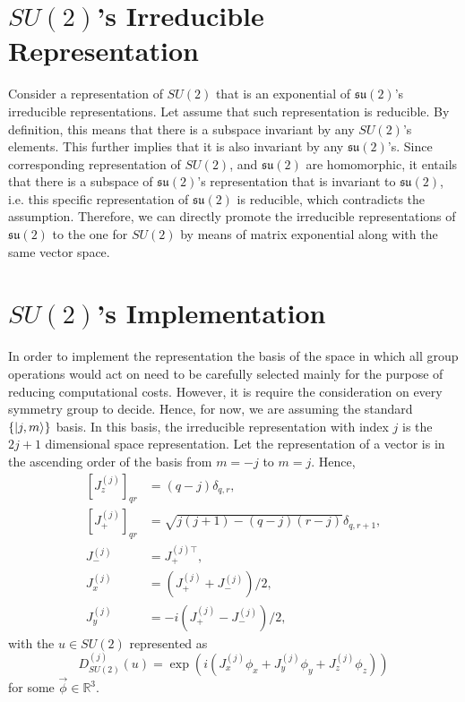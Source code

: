 \documentclass[12pt]{revtex4-2}
\begin{document}
\section{$SU(2)$'s Irreducible Representation}
Consider a representation of $SU(2)$ that is an exponential of $\mathfrak{su(2)}$'s irreducible representations. Let assume
that such representation is reducible. By definition, this means that there is a subspace invariant by any $SU(2)$'s elements.
This further implies that it is also invariant by any $\mathfrak{su(2)}$'s. Since corresponding representation of $SU(2)$,
and $\mathfrak{su(2)}$ are homomorphic, it entails that there is a subspace of $\mathfrak{su(2)}$'s representation that is
invariant to $\mathfrak{su(2)}$, i.e. this specific representation of $\mathfrak{su(2)}$ is reducible, which contradicts
the assumption. Therefore, we can directly promote the irreducible representations of $\mathfrak{su(2)}$ to the one for 
$SU(2)$ by means of matrix exponential along with the same vector space.

\section{$SU(2)$'s Implementation}
In order to implement the representation the basis of the space in which all group operations would act on need to be carefully
selected mainly for the purpose of reducing computational costs. However, it is require the consideration on every symmetry
group to decide. Hence, for now, we are assuming the standard $\{\ket{j, m}\}$ basis. In this basis, the irreducible
representation with index $j$ is the $2j+1$ dimensional space representation. Let the representation of a vector is in 
the ascending order of the basis from $m = -j$ to $m = j$. Hence,
\begin{equation}
    \begin{aligned}
        \left[J_z^{(j)}\right]_{qr} &= (q-j)\delta_{q,r}, \\
        \left[J_+^{(j)}\right]_{qr} &= \sqrt{j(j+1)-(q-j)(r-j)}\delta_{q,r+1}, \\
        J_-^{(j)} &= J_+^{(j)\top}, \\
        J_x^{(j)} &= \left(J_+^{(j)}+J_-^{(j)}\right)/2, \\
        J_y^{(j)} &= -i\left(J_+^{(j)}-J_-^{(j)}\right)/2,
    \end{aligned}
\end{equation}
with the $u\in SU(2)$ represented as
\begin{equation}
    D^{(j)}_{SU(2)}(u) = \exp(i(J_x^{(j)}\phi_x+J_y^{(j)}\phi_y+J_z^{(j)}\phi_z))
\end{equation}
for some $\vec{\phi}\in\mathbb{R}^3$.
\end{document}
